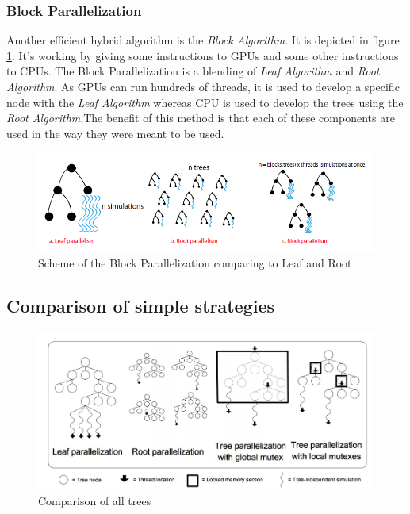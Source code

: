 \subsubsection{Block Parallelization}

Another efficient hybrid algorithm is the \emph{Block Algorithm}\cite{GPU}.  It is depicted in figure \ref{block}. It's working by giving some instructions to GPUs and some other instructions to CPUs. The Block Parallelization is a blending of \emph{Leaf Algorithm} and \emph{Root Algorithm}. As GPUs can run hundreds of threads, it is used to develop a specific node with the \emph{Leaf Algorithm} whereas CPU is used to develop the trees using the \emph{Root Algorithm}.The benefit of this method is that each of these components are used in the way they were meant to be used.

\begin{figure}[!h] 
\centerline{\includegraphics[scale=0.60]{2_State_of_the_art/Strategy_of_root_parallelization_Mikail/block.png}}
   \caption{\label{étiquette} Scheme of the Block Parallelization comparing to Leaf and Root}
\label{block}
\end{figure}

\subsection{Comparison of simple strategies}
\begin{figure}[!h] 
\centerline{\includegraphics[scale=0.60]{2_State_of_the_art/Strategy_of_root_parallelization_Mikail/impara.png}}
   \caption{\label{étiquette} Comparison of all trees}
\label{comp_algo}
\end{figure}


